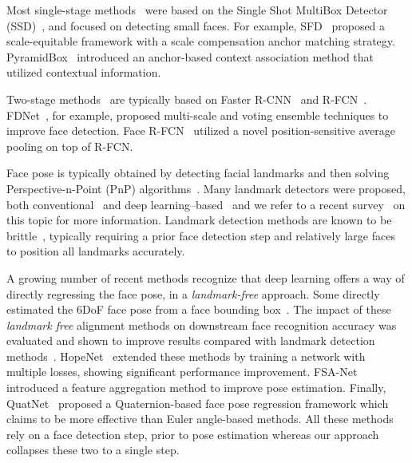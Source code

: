 \documentclass[final]{cvpr}
\newcommand{\minisection}[1]{\vspace{1mm}\noindent{\textbf{#1}.}}
\begin{document}
Most single-stage methods~\cite{dsfd, ssh, pyramidbox, s3fd} were based on the Single Shot MultiBox Detector (SSD)~\cite{ssd}, and focused on detecting small faces. For example, SFD~\cite{s3fd} proposed a scale-equitable framework with a scale compensation anchor matching strategy. PyramidBox~\cite{pyramidbox} introduced an anchor-based context association method that utilized contextual information. 


Two-stage methods~\cite{facerfcn, fdnet} are typically based on Faster R-CNN~\cite{faster_rcnn} and R-FCN~\cite{rfcn}. FDNet~\cite{fdnet}, for example, proposed multi-scale and voting ensemble techniques to improve face detection. Face R-FCN~\cite{facerfcn} utilized a novel position-sensitive average pooling on top of R-FCN. 




\minisection{Face alignment and pose estimation}
Face pose is typically obtained by detecting facial landmarks and then solving Perspective-n-Point (PnP) algorithms~\cite{posit, epnp}. Many landmark detectors were proposed, both conventional~\cite{burgos2013robust, cao2014face, cootes1998active, liu2007generic} and deep learning--based~\cite{bulat2017far, sun2013deep, wu2017facial, zhu2012face} and we refer to a recent survey~\cite{landmark_survey} on this topic for more information. Landmark detection methods are known to be brittle~\cite{chang2019deep, faceposenet}, typically requiring a prior face detection step and relatively large faces to position all landmarks accurately.  


\begin{figure}[!t]
\end{figure}

A growing number of recent methods recognize that deep learning offers a way of directly regressing the face pose, in a {\em landmark-free} approach. Some directly estimated the 6DoF face pose from a face bounding box~\cite{chang2019deep,faceposenet,chang2018expnet,kuhnke2019deep,mustikovela2020self,hopenet,fsanet}. The impact of these {\em landmark free} alignment methods on downstream face recognition accuracy was evaluated and shown to improve results compared with landmark detection methods~\cite{chang2019deep, faceposenet}. HopeNet~\cite{hopenet} extended these methods by training a network with multiple losses, showing significant performance improvement. FSA-Net~\cite{fsanet} introduced a feature aggregation method to improve pose estimation. 
Finally, QuatNet~\cite{quatnet} proposed a Quaternion-based face pose regression framework which claims to be more effective than Euler angle-based methods. 
All these methods rely on a face detection step, prior to pose estimation whereas our approach collapses these two to a single step.
\end{document}

